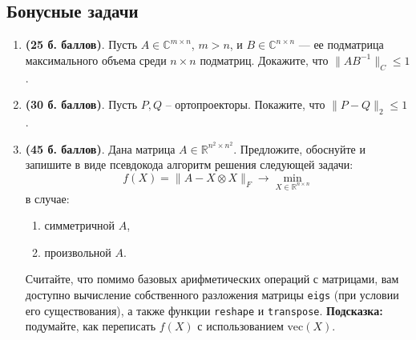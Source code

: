 \documentclass[a4paper, 11pt]{article}
\begin{document}
\subsection*{Бонусные задачи}
\begin{enumerate}
	\item \textbf{(25 б. баллов)}.
	Пусть $A \in \mathbb{C}^{m\times n}$, $m> n$, и $B\in \mathbb{C}^{n\times n}$ --- ее подматрица максимального объема среди $n\times n$ подматриц. Докажите, что $\|AB^{-1}\|_C \leq 1$.
	\item \textbf{(30 б. баллов)}.  Пусть $P,Q$ -- ортопроекторы. Покажите, что $\|P - Q\|_2 \leq 1$.
	\item \textbf{(45 б. баллов)}. Дана матрица $A\in\mathbb{R}^{n^2\times n^2}$. Предложите, обоснуйте и запишите в виде псевдокода алгоритм решения следующей задачи:
	\[
	f(X) =  \|A - X \otimes X\|_F \to \min_{X\in\mathbb{R}^{n\times n}}
	\]
	в случае:
	\begin{enumerate}
		\item симметричной $A$,
		\item произвольной $A$.
	\end{enumerate}
	Считайте, что помимо базовых арифметических операций с матрицами, вам доступно вычисление собственного разложения матрицы \texttt{eigs} (при условии его существования), а также функции \texttt{reshape} и \texttt{transpose}.
	\textbf{Подсказка:} подумайте, как переписать  $f(X)$ с использованием $\mathrm{vec}(X)$.

\end{enumerate}
\end{document}
